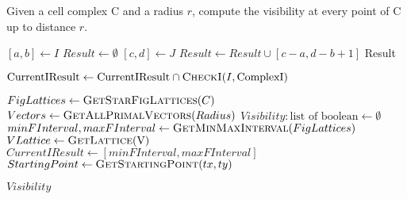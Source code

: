 \documentclass[runningheads]{llncs}
\begin{document}
    \begin{algorithm}
        \caption{Given a cell complex C and a radius \(r\), compute the visibility at every point of C up to distance \(r\).}
        \label{alg:visibility}
        \begin{algorithmic}

                \State $[a, b] \gets I$
                \State $Result \gets \emptyset$
                    \State $[c, d] \gets J$
                        \State $Result \gets Result \cup [c-a,d-b+1]$
                    \EndIf
                \EndFor
                \State \Return Result
            \EndFunction

                    \State $\text{CurrentIResult} \gets \text{CurrentIResult} \cap \Call{CheckI}{I, \text{ComplexI}}$
                \EndFor
                \State \Return {}
            \EndFunction

                \State $FigLattices \gets \Call{GetStarFigLattices}{C}$
                \State $Vectors \gets \Call{GetAllPrimalVectors}{Radius}$
                \State $Visibility: \text{list of boolean} \gets \emptyset$
                \State $minFInterval, maxFInterval \gets \Call{GetMinMaxInterval}{FigLattices}$
                    \State $VLattice \gets \Call{GetLattice}{\text{V}}$
                        \State $CurrentIResult \gets [minFInterval, maxFInterval]$
                        \State $StartingPoint \gets \Call{GetStartingPoint}{tx, ty}$
                            \State {}
                        \EndFor
                        \State {}
                    \EndFor
                \EndFor
                \State \Return $Visibility$
            \EndFunction


        \end{algorithmic}
    \end{algorithm}
\end{document}
